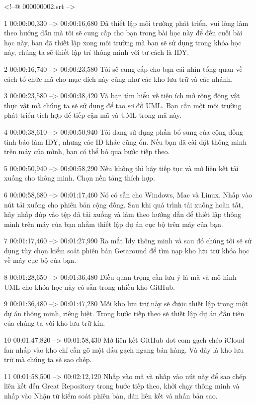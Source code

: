 <!--@ 000000002.srt -->

1
00:00:00,330 --> 00:00:16,680
Đã thiết lập môi trường phát triển, vui lòng làm theo hướng dẫn mà tôi sẽ cung cấp cho bạn trong bài học này để đến cuối bài học này, bạn đã thiết lập xong môi trường mà bạn sẽ sử dụng trong khóa học này, chúng ta sẽ thiết lập trí thông minh với tư cách là IDY.

2
00:00:16,740 --> 00:00:23,580
Tôi sẽ cung cấp cho bạn cái nhìn tổng quan về cách tổ chức mã cho mục đích này cũng như các kho lưu trữ và các nhánh.

3
00:00:23,580 --> 00:00:38,420
Và bạn tìm hiểu về tiện ích mở rộng động vật thực vật mà chúng ta sẽ sử dụng để tạo sơ đồ UML.  Bạn cần một môi trường phát triển tích hợp để tiếp cận mã và UML trong mã này.

4
00:00:38,610 --> 00:00:50,940
Tôi đang sử dụng phần bổ sung của cộng đồng tình báo làm IDY, nhưng các ID khác cũng ổn.  Nếu bạn đã cài đặt thông minh trên máy của mình, bạn có thể bỏ qua bước tiếp theo.

5
00:00:50,940 --> 00:00:58,290
Nếu không thì hãy tiếp tục và mở liên kết tải xuống cho thông minh.  Chọn nền tảng thích hợp.

6
00:00:58,680 --> 00:01:17,460
Nó có sẵn cho Windows, Mac và Linux.  Nhấp vào nút tải xuống cho phiên bản cộng đồng.  Sau khi quá trình tải xuống hoàn tất, hãy nhấp đúp vào tệp đã tải xuống và làm theo hướng dẫn để thiết lập thông minh trên máy của bạn nhằm thiết lập dự án cục bộ trên máy của bạn.

7
00:01:17,460 --> 00:01:27,990
Ra mắt Idy thông minh và sau đó chúng tôi sẽ sử dụng tùy chọn kiểm soát phiên bản Getaround để tìm nạp kho lưu trữ khóa học về máy cục bộ của bạn.

8
00:01:28,650 --> 00:01:36,480
Điều quan trọng cần lưu ý là mã và mô hình UML cho khóa học này có sẵn trong nhiều kho GitHub.

9
00:01:36,480 --> 00:01:47,280
Mỗi kho lưu trữ này sẽ được thiết lập trong một dự án thông minh, riêng biệt.  Trong bước tiếp theo sẽ thiết lập dự án đầu tiên của chúng ta với kho lưu trữ kín.

10
00:01:47,820 --> 00:01:58,430
Mở liên kết GitHub dot com gạch chéo iCloud fan nhấp vào kho chỉ cần gõ một dấu gạch ngang bán hàng.  Và đây là kho lưu trữ mà chúng ta sẽ sao chép.

11
00:01:58,500 --> 00:02:12,120
Nhấp vào mã và nhấp vào nút này để sao chép liên kết đến Great Repository trong bước tiếp theo, khởi chạy thông minh và nhấp vào Nhận từ kiểm soát phiên bản, dán liên kết và nhấn bản sao.

